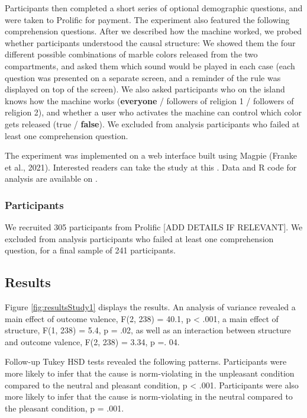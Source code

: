 \documentclass[fleqn,reqno,10pt]{article}
\begin{document}
Participants then completed a short series of optional demographic questions, and were taken to Prolific for payment. The experiment also featured the following comprehension questions. After we described how the machine worked, we probed whether participants understood the causal structure: We showed them the four different possible combinations of marble colors released from the two compartments, and asked them which sound would be played in each case (each question was presented on a separate screen, and a reminder of the rule was displayed on top of the screen). We also asked participants who on the island knows how the machine works (\textbf{everyone} / followers of religion 1 / followers of religion 2), and whether a user who activates the machine can control which color gets released (true / \textbf{false}). We excluded from analysis participants who failed at least one comprehension question.

The experiment was implemented on a web interface built using Magpie (Franke et al., 2021). Interested readers can take the study at this \href{https://magpie-ea.github.io/magpie3-inferences-from-causal-attribution/}{\color{blue}{link}}. Data and R code for analysis are available on \href{https://github.com/magpie-ea/magpie3-inferences-from-causal-attribution}{\color{blue}{Github}}.\\


\subsubsection{Participants}
We recruited 305 participants from Prolific [ADD DETAILS IF RELEVANT]. We excluded from analysis participants who failed at least one comprehension question, for a final sample of 241 participants.

\subsection{Results}

Figure \ref{fig:resultsStudy1} displays the results. An analysis of variance revealed a main effect of outcome valence, F(2, 238) = 40.1, p < .001, a main effect of structure, F(1, 238) = 5.4, p = .02, as well as an interaction between structure and outcome valence, F(2, 238) = 3.34, p =. 04.

Follow-up Tukey HSD tests revealed the following patterns. Participants were more likely to infer that the cause is norm-violating in the unpleasant condition compared to the neutral and pleasant condition, p < .001. Participants were also more likely to infer that the cause is norm-violating in the neutral compared to the pleasant condition, p = .001.
\end{document}
